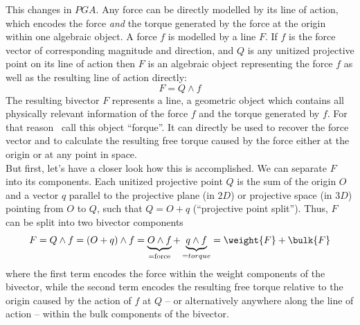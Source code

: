 This changes in $PGA$. Any force can be directly modelled by its line of action, which
encodes the force \emph{and} the torque generated by the force at the origin within one
algebraic object. A force $f$ is modelled by a line $F$. If $f$ is the force vector of
corresponding magnitude and direction, and $Q$ is any unitized projective point on its
line of action then $F$ is an algebraic object representing the force $f$ as well as the
resulting line of action directly:
\begin{equation}
F = Q \wedge f
\label{eq:line_of_action}
\end{equation}
The resulting bivector $F$ represents a line, a geometric object which contains all
physically relevant information of the force $f$ and the torque generated by $f$. For that
reason~\cite{Dynamics_in_PGA_plane-based_Dorst-DeKennik:2023} call this object ``forque''.
It can directly be used to recover the force vector and to calculate the resulting free
torque caused by the force either at the origin or at any point in space. \\

But first, let's have a closer look how this is accomplished. We can separate $F$ into its
components. Each unitized projective point $Q$ is the sum of the origin $O$ and a vector
$q$ parallel to the projective plane (in $2D$) or projective space (in $3D$) pointing from
$O$ to $Q$, such that $Q = O + q$ (``projective point split''). Thus, $F$ can be split into
two bivector components
\begin{equation}
    F = Q \wedge f = (O + q) \wedge f =
    \underbrace{O \wedge f}_{\text{=force}} + \underbrace{q \wedge f}_{=torque}
    = \weight{F} + \bulk{F}
\label{eq:line_of_action_components}
\end{equation}
where the first term encodes the force within the weight components of the bivector, while
the second term encodes the resulting free torque relative to the origin caused by the
action of $f$ at $Q$ -- or alternatively anywhere along the line of action -- within the
bulk components of the bivector. \\

